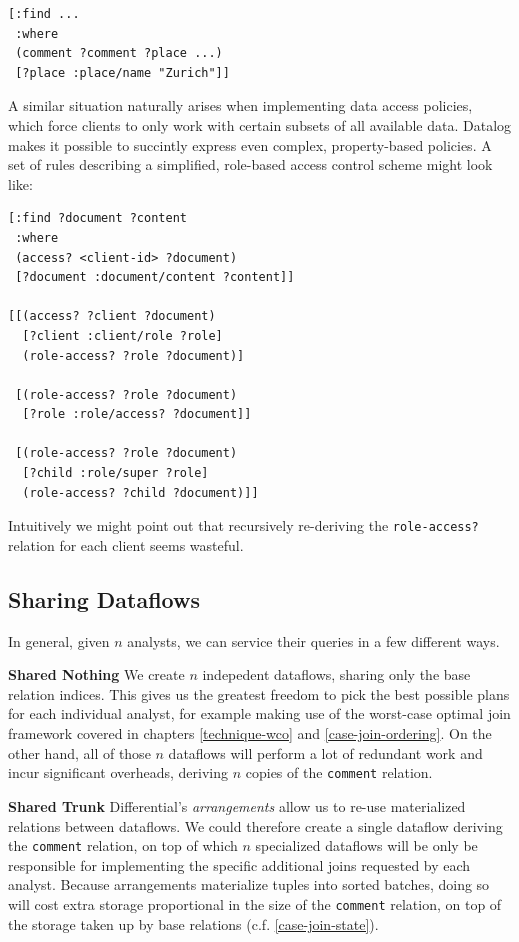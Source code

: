 \documentclass[../catalog.tex]{subfiles}
\begin{document}
\begin{verbatim}
[:find ...
 :where
 (comment ?comment ?place ...)
 [?place :place/name "Zurich"]]
\end{verbatim}

A similar situation naturally arises when implementing data access
policies, which force clients to only work with certain subsets of all
available data. Datalog makes it possible to succintly express even
complex, property-based policies. A set of rules describing a
simplified, role-based access control scheme might look like:

\begin{verbatim}
[:find ?document ?content
 :where
 (access? <client-id> ?document)
 [?document :document/content ?content]]

[[(access? ?client ?document)
  [?client :client/role ?role]
  (role-access? ?role ?document)]

 [(role-access? ?role ?document)
  [?role :role/access? ?document]]
 
 [(role-access? ?role ?document)
  [?child :role/super ?role]
  (role-access? ?child ?document)]]
\end{verbatim}

Intuitively we might point out that recursively re-deriving the
\texttt{role-access?} relation for each client seems wasteful.

\subsection{Sharing Dataflows}

In general, given $n$ analysts, we can service their queries in a few
different ways.

\textbf{Shared Nothing} We create $n$ indepedent dataflows, sharing
only the base relation indices. This gives us the greatest freedom to
pick the best possible plans for each individual analyst, for example
making use of the worst-case optimal join framework covered in
chapters \ref{technique-wco} and \ref{case-join-ordering}. On the
other hand, all of those $n$ dataflows will perform a lot of redundant
work and incur significant overheads, deriving $n$ copies of the
\texttt{comment} relation.

\textbf{Shared Trunk} Differential's \emph{arrangements} allow us to
re-use materialized relations between dataflows. We could therefore
create a single dataflow deriving the \texttt{comment} relation, on
top of which $n$ specialized dataflows will be only be responsible for
implementing the specific additional joins requested by each
analyst. Because arrangements materialize tuples into sorted batches,
doing so will cost extra storage proportional in the size of the
\texttt{comment} relation, on top of the storage taken up by base
relations (c.f. \ref{case-join-state}).
\end{document}
